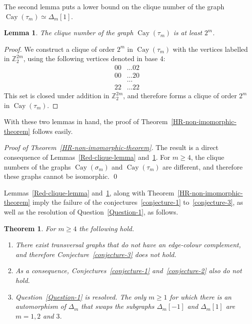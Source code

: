 \documentclass[12pt,a4paper]{article}
\newcommand{\mb}[1]{\mathbb{#1}}
\newcommand{\Cay}{\operatorname{Cay}}
\newcommand{\Z}{\mb{Z}}
\newcommand{\isomorphic}{\simeq}
\newtheorem{Lemma}{Lemma}
\newtheorem{Theorem}{Theorem}
\newenvironment{proofof}[1]{\noindent\emph{Proof of #1.}}{\qed}
\begin{document}
The second lemma puts a lower bound on the clique number of the graph $\Cay(\tau_m) \isomorphic \varDelta_m[1]$.
\begin{Lemma}
\label{Blue-clique-lemma}
The clique number of the graph $\Cay(\tau_m)$ is at least $2^m$.
\end{Lemma}
\begin{proof}
We construct a clique of order $2^m$ in $\Cay(\tau_m)$ with the vertices labelled in $\Z_2^{2m}$,
using the following vertices denoted in base 4:
\begin{align*}
00 &\ldots 02
\\
00 &\ldots 20
\\
&\ldots
\\
22 &\ldots 22
\end{align*}
This set is closed under addition in $\Z_2^{2 m}$,
and therefore forms a clique of order $2^m$ in $\Cay(\tau_m)$.
\end{proof}

With these two lemmas in hand, the proof of Theorem~\ref{HR-non-imomorphic-theorem} follows easily.

\begin{proofof}{Theorem~\ref{HR-non-imomorphic-theorem}}
The result is a direct consequence of Lemmas~\ref{Red-clique-lemma} and~\ref{Blue-clique-lemma}.
For $m \geqslant 4$, the clique numbers of the graphs $\Cay(\sigma_m)$ and $\Cay(\tau_m)$ are different,
and therefore these graphs cannot be isomorphic.
\end{proofof}

Lemmas~\ref{Red-clique-lemma} and~\ref{Blue-clique-lemma}, along with Theorem~\ref{HR-non-imomorphic-theorem}
imply the failure of the conjectures~\ref{conjecture-1} to~\ref{conjecture-3}, as well as the resolution of Question~\ref{Question-1}, as follows.
\begin{Theorem}
\label{Conjectures-are-false-theorem}
For $m \geqslant 4$ the following hold.
\begin{enumerate}
 \item
There exist transversal graphs that do not have an edge-colour complement, and
therefore Conjecture~\ref{conjecture-3} does not hold.
\item
As a consequence, Conjectures~\ref{conjecture-1} and~\ref{conjecture-2} also do not hold.
\item
Question~\ref{Question-1} is resolved.
The only $m \geqslant 1$ for which there is an automorphism of $\varDelta_m$
that swaps the subgraphs $\varDelta_m[-1]$ and $\varDelta_m[1]$
are $m=1,2$ and $3$.
\end{enumerate}

\end{Theorem}
\end{document}
